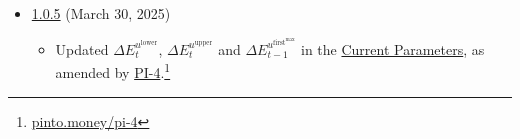 \documentclass[class=article, crop=false]{standalone}
\begin{document}
\begin{itemize}[topsep=0pt, itemsep=3pt,leftmargin=16pt]
    \item \href{https://github.com/pinto-org/whitepaper/blob/master/version-history/pinto1_0_5.pdf}{1.0.5} (March 30, 2025)
    
    \begin{itemize}
        \item Updated $\Delta E_{t}^{u^{\text{lower}}}$, $\Delta E_{t}^{u^{\text{upper}}}$ and $\Delta E_{t-1}^{u^{\text{first}^{\text{max}}}}$ in the \hyperlink{subsection.12.1}{Current Parameters}, as amended by \href{https://pinto.money/pi-4}{PI-4}.\footnote{\href{https://pinto.money/pi-4}{pinto.money/pi-4}}       
    \end{itemize}
    
\end{itemize}
\end{document}
